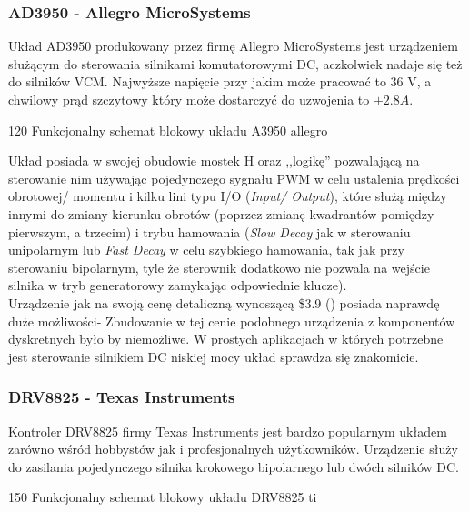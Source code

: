 \subsubsection{AD3950 - Allegro MicroSystems}
\label{ss:allegro}

Układ AD3950 produkowany przez firmę Allegro MicroSystems jest urządzeniem służącym do sterowania silnikami komutatorowymi DC, aczkolwiek nadaje się też do silników VCM. Najwyższe napięcie przy jakim może pracować to 36 V, a chwilowy prąd szczytowy który może dostarczyć do uzwojenia to $ \pm2.8 A $.

	{120}
	{Funkcjonalny schemat blokowy układu A3950}
	{allegro}

Układ posiada w swojej obudowie mostek H oraz ,,logikę'' pozwalającą na sterowanie nim używając pojedynczego sygnału PWM w celu ustalenia prędkości obrotowej/ momentu i kilku lini typu I/O ({\it Input/ Output}), które służą między innymi do zmiany kierunku obrotów (poprzez zmianę kwadrantów pomiędzy pierwszym, a trzecim) i trybu hamowania ({\it Slow Decay} jak w sterowaniu unipolarnym lub {\it Fast Decay} w celu szybkiego hamowania, tak jak przy sterowaniu bipolarnym, tyle że sterownik dodatkowo nie pozwala na wejście silnika w tryb generatorowy zamykając odpowiednie klucze). \\

Urządzenie jak na swoją cenę detaliczną wynoszącą \$3.9 (\cite{digikey}) posiada naprawdę duże możliwości- Zbudowanie w tej cenie podobnego urządzenia z komponentów dyskretnych było by niemożliwe. W prostych aplikacjach w których potrzebne jest sterowanie silnikiem DC niskiej mocy układ sprawdza się znakomicie.

\subsubsection{DRV8825 - Texas Instruments}

Kontroler DRV8825 firmy Texas Instruments jest bardzo popularnym układem zarówno wśród hobbystów jak i profesjonalnych użytkowników. Urządzenie służy do  zasilania pojedynczego silnika krokowego bipolarnego lub dwóch silników DC.

	{150}
	{Funkcjonalny schemat blokowy układu DRV8825}
	{ti}

